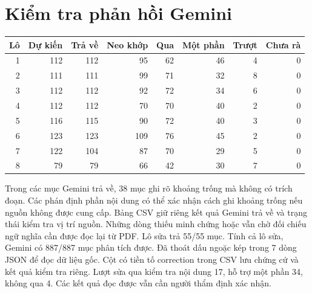\section*{Kiểm tra phản hồi Gemini}
\begin{center}\begin{tabular}{rrrrrrrr}\toprule Lô & Dự kiến & Trả về & Neo khớp & Qua & Một phần & Trượt & Chưa rà \\ \midrule
1 & 112 & 112 & 95 & 62 & 46 & 4 & 0 \\
2 & 111 & 111 & 99 & 71 & 32 & 8 & 0 \\
3 & 112 & 112 & 92 & 72 & 34 & 6 & 0 \\
4 & 112 & 112 & 70 & 70 & 40 & 2 & 0 \\
5 & 116 & 115 & 90 & 72 & 40 & 3 & 0 \\
6 & 123 & 123 & 109 & 76 & 45 & 2 & 0 \\
7 & 122 & 104 & 87 & 70 & 29 & 5 & 0 \\
8 & 79 & 79 & 66 & 42 & 30 & 7 & 0 \\
\bottomrule\end{tabular}\end{center}
Trong các mục Gemini trả về, 38 mục ghi rõ khoảng trống mà không có trích đoạn. Các phán định phần nội dung có thể xác nhận cách ghi khoảng trống nếu nguồn không được cung cấp.
Bảng CSV giữ riêng kết quả Gemini trả về và trạng thái kiểm tra vị trí nguồn. Những dòng thiếu
minh chứng hoặc vẫn chờ đối chiếu ngữ nghĩa cần được đọc lại từ PDF.
Lô sửa trả 55/55 mục. Tính cả lô sửa, Gemini có 887/887 mục phân tích được. Đã thoát dấu ngoặc kép trong 7 dòng JSON để đọc dữ liệu gốc. Cột có tiền tố correction trong CSV lưu chứng cứ và kết quả kiểm tra riêng.
Lượt sửa qua kiểm tra nội dung 17, hỗ trợ một phần 34, không qua 4. Các kết quả đọc được vẫn cần người thẩm định xác nhận.
